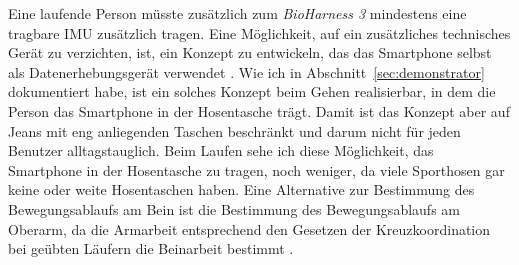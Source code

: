 Eine laufende Person müsste zusätzlich zum \emph{BioHarness 3} mindestens eine tragbare \ac{IMU} zusätzlich tragen. Eine Möglichkeit, auf ein zusätzliches technisches Gerät zu verzichten, ist, ein Konzept zu entwickeln, das das Smartphone selbst als Datenerhebungsgerät verwendet \citep[vgl.][]{Strohrmann2013, Strohrmann2014}. Wie ich in Abschnitt~\ref{sec:demonstrator} dokumentiert habe, ist ein solches Konzept beim Gehen realisierbar, in dem die Person das Smartphone in der Hosentasche trägt. Damit ist das Konzept aber auf Jeans mit eng anliegenden Taschen beschränkt und darum nicht für jeden Benutzer alltagstauglich. Beim Laufen sehe ich diese Möglichkeit, das Smartphone in der Hosentasche zu tragen, noch weniger, da viele Sporthosen gar keine oder weite Hosentaschen haben. Eine Alternative zur Bestimmung des Bewegungsablaufs am Bein ist die Bestimmung des Bewegungsablaufs am Oberarm, da die Armarbeit entsprechend den Gesetzen der Kreuzkoordination bei geübten Läufern die Beinarbeit bestimmt \citep[vgl.][S.~70]{Marquardt2011}.